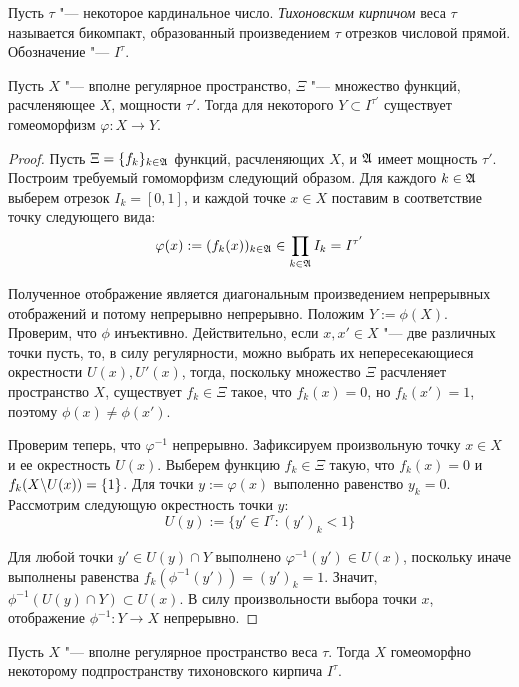 \begin{definition}
    Пусть $\tau$ "--- некоторое кардинальное число. \textit{Тихоновским кирпичом} веса $\tau$ называется бикомпакт, образованный произведением $\tau$ отрезков числовой прямой. Обозначение "--- $I^{\tau}$.
\end{definition}

\begin{proposition}\label{thm2prop2}
    Пусть $X$ "--- вполне регулярное пространство, $\Xi$ "--- множество фун\-кций, расчленяющее $X$, мощности $\tau'$. Тогда для некоторого $Y \subset I^{\tau'}$ существует гомеоморфизм $\varphi: X \rightarrow Y$.
\end{proposition}

\begin{proof}
    Пусть $\Xi = \lbrace f_k\rbrace_{k \in \mathfrak A}$ функций, расчленяющих $X$, и $\mathfrak A$ имеет мощность $\tau'$. Построим требуемый гомоморфизм следующий образом. Для каждого $k \in \mathfrak A$ выберем отрезок $I_k = [0, 1]$, и каждой точке $x\in X$ поставим в соответствие точку следующего вида:
    \[\varphi(x) := (f_k(x))_{k \in \mathfrak A} \in \prod_{k \in \mathfrak A}I_k = I^{\tau'}\]
    
    Полученное отображение является диагональным произведением непрерывных отображений и потому непрерывно непрерывно. Положим $Y := \phi(X)$. Проверим, что $\phi$ инъективно. Действительно, если $x, x' \in X$ "--- две различных точки пусть, то, в силу регулярности, можно выбрать их непересекающиеся окрестности $U(x), U'(x)$, тогда, поскольку множество $\Xi$ расчленяет пространство $X$, существует $f_k \in \Xi$ такое, что $f_k(x) = 0$, но $f_k(x') = 1$, поэтому $\phi(x) \ne \phi(x')$.

    Проверим теперь, что $\varphi^{-1}$ непрерывно. Зафиксируем произвольную точку $x \in X$ и ее окрестность $U(x)$. Выберем функцию $f_k \in \Xi$ такую, что $f_k(x) = 0$ и ${f_k(X \backslash U(x)) = \{1\}}$. Для точки $y := \varphi(x)$ выполенно равенство $y_k= 0$. Рассмотрим следующую окрестность точки $y$:
    \[U(y) := \{y' \in I^\tau: (y')_k < 1\}\]
    
    Для любой точки $y' \in U(y) \cap Y$ выполнено $\varphi^{-1}(y') \in U(x)$, поскольку иначе выполнены равенства $f_k(\phi^{-1}(y')) = (y')_k = 1$. Значит, $\phi^{-1}(U(y) \cap Y) \subset U(x)$. В силу произвольности выбора точки $x$, отображение $\phi^{-1} : Y \to X$ непрерывно.
\end{proof}

\begin{theorem}
    Пусть $X$ "--- вполне регулярное пространство веса $\tau$. Тогда $X$ гомеоморфно некоторому подпространству тихоновского кирпича $I^\tau$.
\end{theorem}

